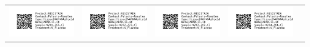 \documentclass[10pt,notitlepage,letterpaper]{article}
\def\s{\phantom{xx}}
\def\w{1.27in}
\begin{document}
\begin{tabular}[t]{ c @{\s} c @{\s} c @{\s} c @{\s} c }
\includegraphics[width=\w]{label_N261_266_Cl} & \includegraphics[width=\w]{label_N262_272_Cl} & \includegraphics[width=\w]{label_N263_282_Cl} & \includegraphics[width=\w]{label_N264_284_Cl} & 

\end{tabular}
\end{document}
